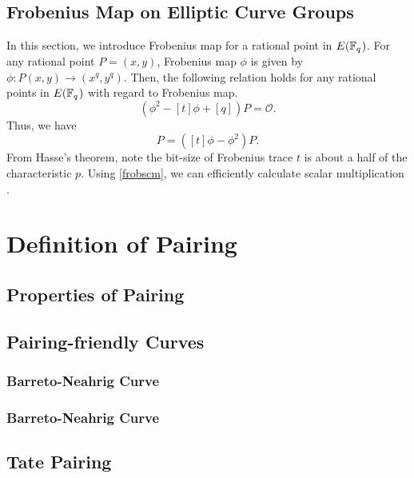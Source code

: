 \subsection{Frobenius Map on Elliptic Curve Groups}
In this section, we introduce Frobenius map for a rational point in $E({\mathbb{F}}_{q^{}})$.
For any rational point $P=(x, y)$, Frobenius map $\phi$ is given by $\phi:P(x, y) \rightarrow ({x}^q, {y}^q)$.
Then, the following relation holds for any rational points in $E({\mathbb{F}}_{q^{}})$ with regard to Frobenius map.
\begin{equation*}
\left(\phi^{2}-[t]\phi+[q]\right)P=\mathcal{O}.
\end{equation*}
Thus, we have
\begin{equation}
[q]P=\left([t]\phi-\phi^2\right)P. \label{frobscm}
\end{equation}
From Hasse's theorem, note the bit-size of Frobenius trace $t$ is about a half of the characteristic $p$. 
Using \eqref{frobscm}, we can efficiently calculate scalar multiplication \cite{C:Koblitz91}.

\section{Definition of Pairing} \label{secDefPairing} %

\subsection{Properties of Pairing}
\subsection{Pairing-friendly Curves}\label{sec:pfc}

\subsubsection{Barreto-Neahrig Curve}

\subsubsection{Barreto-Neahrig Curve}



\subsection{Tate Pairing}


